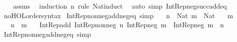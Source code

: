 \begin{isabellebody}
%
\isadelimproof
\ \ %
\endisadelimproof
%
\isatagproof
{}\isamarkupfalse%
\ assms\ \isamarkupfalse%
\ {\isacharparenleft}{\kern0pt}induction\ n\ rule{\isacharcolon}{\kern0pt}\ Nat{\isacharunderscore}{\kern0pt}induct{\isacharparenright}{\kern0pt}\isanewline
\ \ {\isacharparenleft}{\kern0pt}auto\ simp{\isacharcolon}{\kern0pt}\ Int{\isacharunderscore}{\kern0pt}Rep{\isacharunderscore}{\kern0pt}neg{\isacharunderscore}{\kern0pt}succ{\isacharunderscore}{\kern0pt}add{\isacharunderscore}{\kern0pt}eq{\isacharparenright}{\kern0pt}%
\endisatagproof
{\isafoldproof}%
%
\isadelimproof
\isanewline
%
\endisadelimproof
\isanewline
{}\isamarkupfalse%
\ no{\isacharunderscore}{\kern0pt}HOL{\isacharunderscore}{\kern0pt}order{\isacharunderscore}{\kern0pt}syntax\isanewline
\isanewline
\isanewline
{}\isamarkupfalse%
\ Int{\isacharunderscore}{\kern0pt}Rep{\isacharunderscore}{\kern0pt}nonneg{\isacharunderscore}{\kern0pt}add{\isacharunderscore}{\kern0pt}neg{\isacharunderscore}{\kern0pt}eq\ {\isacharbrackleft}{\kern0pt}simp{\isacharbrackright}{\kern0pt}{\isacharcolon}{\kern0pt}\isanewline
\ \ \ {\isachardoublequoteopen}n\ {\isacharcolon}{\kern0pt}\ Nat{\isachardoublequoteclose}\ {\isachardoublequoteopen}m\ {\isacharcolon}{\kern0pt}\ Nat{\isachardoublequoteclose}\isanewline
\ \ \ {\isachardoublequoteopen}m\ {\isasymnoteq}\ {}{\isachardoublequoteclose}\isanewline
\ \ \ {\isachardoublequoteopen}n\ {\isacharless}{\kern0pt}\ m{\isachardoublequoteclose}\isanewline
\ \ \ {\isachardoublequoteopen}Int{\isacharunderscore}{\kern0pt}Rep{\isacharunderscore}{\kern0pt}add\ {\isacharparenleft}{\kern0pt}Int{\isacharunderscore}{\kern0pt}Rep{\isacharunderscore}{\kern0pt}nonneg\ n{\isacharparenright}{\kern0pt}\ {\isacharparenleft}{\kern0pt}Int{\isacharunderscore}{\kern0pt}Rep{\isacharunderscore}{\kern0pt}neg\ m{\isacharparenright}{\kern0pt}\ {\isacharequal}{\kern0pt}\ Int{\isacharunderscore}{\kern0pt}Rep{\isacharunderscore}{\kern0pt}neg\ {\isacharparenleft}{\kern0pt}m\ {\isacharminus}{\kern0pt}\ n{\isacharparenright}{\kern0pt}{\isachardoublequoteclose}\isanewline
\ \ \isanewline
%
\isadelimproof
%
\endisadelimproof
%
\isatagproof
{}\isamarkupfalse%
%
\endisatagproof
{\isafoldproof}%
%
\isadelimproof
\isanewline
%
\endisadelimproof
\isanewline
{}\isamarkupfalse%
\ Int{\isacharunderscore}{\kern0pt}Rep{\isacharunderscore}{\kern0pt}nonneg{\isacharunderscore}{\kern0pt}add{\isacharunderscore}{\kern0pt}neg{\isacharunderscore}{\kern0pt}eq\ {\isacharbrackleft}{\kern0pt}simp{\isacharbrackright}{\kern0pt}{\isacharcolon}{\kern0pt}\isanewline

\end{isabellebody}
